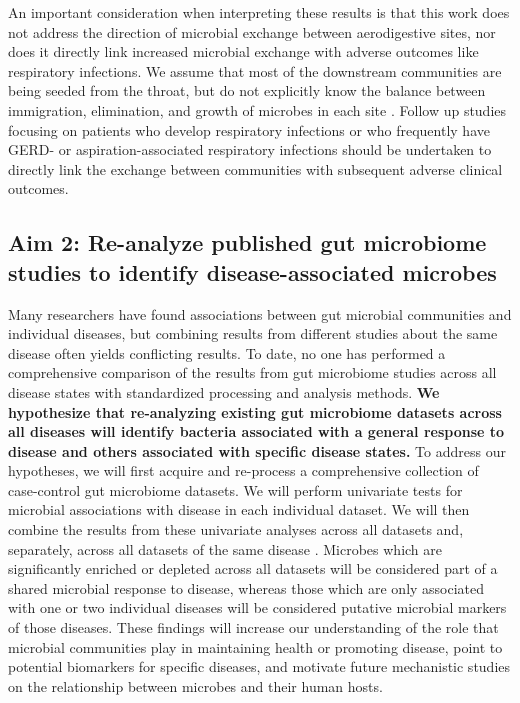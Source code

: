 \documentclass[12pt]{article}
\begin{document}
An important consideration when interpreting these results is that
this work does not address the direction of microbial exchange between 
aerodigestive sites, nor does it directly link increased microbial 
exchange with adverse outcomes like respiratory infections.
We assume that most of the downstream communities are being seeded from the throat, 
but do not explicitly know the balance between immigration, elimination, and 
growth of microbes in each site \cite{bassis-source-2015}.
Follow up studies focusing on patients who develop respiratory 
infections or who frequently have GERD- or aspiration-associated 
respiratory infections should be undertaken to directly link the exchange
between communities with subsequent adverse clinical outcomes. 

\subsection{Aim 2: Re-analyze published gut	microbiome studies to identify disease-associated microbes}\label{sec:aim2}
Many researchers have found associations between gut microbial 
communities and individual diseases, but combining results from 
different studies about the same disease often yields conflicting results. To date, no one has
performed a comprehensive comparison of the results from gut microbiome 
studies across all disease states with standardized processing
and analysis methods.
\textbf{We hypothesize that re-analyzing existing gut microbiome datasets 
across all diseases will identify bacteria
associated with a general response to disease
and others associated with specific disease states.}
To address our hypotheses, we will first acquire and re-process a comprehensive
collection of case-control gut microbiome datasets. 
We will perform univariate tests for 
microbial associations with disease in each individual dataset. 
We will then combine the results from these univariate analyses across all datasets and,
separately, across all datasets of the same disease \cite{zavkin-ztest-2011}.
Microbes which are significantly enriched or depleted across 
all datasets will be considered part of a shared microbial response to
disease, whereas those which are only associated with one or two
individual diseases will be considered putative microbial markers of those diseases.
These findings will increase our understanding of
the role that microbial communities play in maintaining health or promoting disease,
point to potential biomarkers for specific diseases,
and motivate future mechanistic studies on the relationship between microbes and their human hosts.
\end{document}
